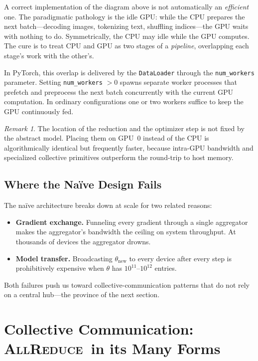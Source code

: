 \documentclass[11pt,a4paper]{article}
\theoremstyle{definition}
\theoremstyle{remark}
\newtheorem*{remark}{Remark}
\theoremstyle{plain}
\newcommand{\allreduce}{\textsc{AllReduce}}
\begin{document}
A correct implementation of the diagram above is not automatically an
\emph{efficient} one. The paradigmatic pathology is the idle GPU: while
the CPU prepares the next batch---decoding images, tokenizing text,
shuffling indices---the GPU waits with nothing to do. Symmetrically, the
CPU may idle while the GPU computes. The cure is to treat CPU and GPU as
two stages of a \emph{pipeline}, overlapping each stage's work with the
other's.

In PyTorch, this overlap is delivered by the \texttt{DataLoader} through
the \texttt{num\_workers} parameter. Setting \texttt{num\_workers}
$> 0$ spawns separate worker processes that prefetch and preprocess the
next batch concurrently with the current GPU computation. In ordinary
configurations one or two workers suffice to keep the GPU continuously
fed.

\begin{remark}
The location of the reduction and the optimizer step is not fixed by the
abstract model. Placing them on GPU~0 instead of the CPU is
algorithmically identical but frequently faster, because intra-GPU
bandwidth and specialized collective primitives outperform the round-trip
to host memory.
\end{remark}

\subsection{Where the Na\"ive Design Fails}

The na\"ive architecture breaks down at scale for two related reasons:

\begin{itemize}[leftmargin=1.5em, itemsep=2pt]
  \item \textbf{Gradient exchange.} Funneling every gradient through a
        single aggregator makes the aggregator's bandwidth the ceiling on
        system throughput. At thousands of devices the aggregator drowns.
  \item \textbf{Model transfer.} Broadcasting $\theta_{\text{new}}$ to
        every device after every step is prohibitively expensive when
        $\theta$ has $10^{11}$--$10^{12}$ entries.
\end{itemize}

Both failures push us toward collective-communication patterns that do not
rely on a central hub---the province of the next section.

\section{Collective Communication: \allreduce\ in its Many Forms}
\end{document}
